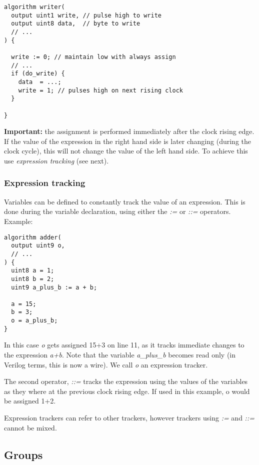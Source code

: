 \documentclass[a4]{article}
\begin{document}
\begin{verbatim}
algorithm writer(
  output uint1 write, // pulse high to write
  output uint8 data,  // byte to write
  // ...
) {

  write := 0; // maintain low with always assign
  // ...
  if (do_write) {
    data  = ...;
    write = 1; // pulses high on next rising clock
  }
  
}
\end{verbatim}


\textbf{Important:} the assignment is performed immediately after the clock rising edge. If the value of the expression in the right hand side is later changing (during the clock cycle), this will not change the value of the left hand side.
To achieve this use \textit{expression tracking} (see next).

\subsubsection{Expression tracking}
\label{sec:exprtrack}

Variables can be defined to constantly track the value of an expression. This is done during the variable declaration, using either the \textit{:=} or \textit{::=} operators. Example:

\begin{verbatim}
algorithm adder(
  output uint9 o,
  // ...
) {
  uint8 a = 1;
  uint8 b = 2;
  uint9 a_plus_b := a + b;
  
  a = 15;
  b = 3;
  o = a_plus_b;
}
\end{verbatim}

In this case \textit{o} gets assigned 15+3 on line 11, as it tracks immediate changes to the expression \textit{a+b}. Note that the variable \textit{a\_plus\_b} becomes read only (in Verilog terms, this is now a wire). We call \textit{o} an expression tracker.

The second operator, \textit{::=} tracks the expression using the values of the variables as they where at the previous clock rising edge. If used in this example, o would be assigned 1+2.

Expression trackers can refer to other trackers, however trackers using \textit{:=} and \textit{::=} cannot be mixed.


\subsection{Groups}
\label{sec:groups}
\end{document}
